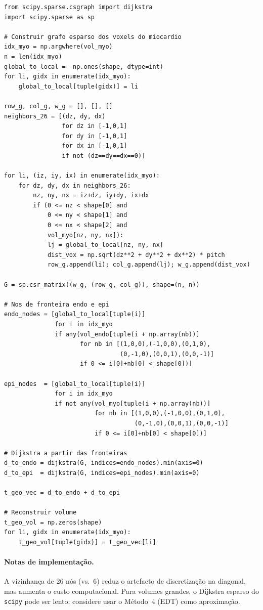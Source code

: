 \begin{lstlisting}
from scipy.sparse.csgraph import dijkstra
import scipy.sparse as sp

# Construir grafo esparso dos voxels do miocardio
idx_myo = np.argwhere(vol_myo)
n = len(idx_myo)
global_to_local = -np.ones(shape, dtype=int)
for li, gidx in enumerate(idx_myo):
    global_to_local[tuple(gidx)] = li

row_g, col_g, w_g = [], [], []
neighbors_26 = [(dz, dy, dx)
                for dz in [-1,0,1]
                for dy in [-1,0,1]
                for dx in [-1,0,1]
                if not (dz==dy==dx==0)]

for li, (iz, iy, ix) in enumerate(idx_myo):
    for dz, dy, dx in neighbors_26:
        nz, ny, nx = iz+dz, iy+dy, ix+dx
        if (0 <= nz < shape[0] and
            0 <= ny < shape[1] and
            0 <= nx < shape[2] and
            vol_myo[nz, ny, nx]):
            lj = global_to_local[nz, ny, nx]
            dist_vox = np.sqrt(dz**2 + dy**2 + dx**2) * pitch
            row_g.append(li); col_g.append(lj); w_g.append(dist_vox)

G = sp.csr_matrix((w_g, (row_g, col_g)), shape=(n, n))

# Nos de fronteira endo e epi
endo_nodes = [global_to_local[tuple(i)]
              for i in idx_myo
              if any(vol_endo[tuple(i + np.array(nb))]
                     for nb in [(1,0,0),(-1,0,0),(0,1,0),
                                (0,-1,0),(0,0,1),(0,0,-1)]
                     if 0 <= i[0]+nb[0] < shape[0])]

epi_nodes  = [global_to_local[tuple(i)]
              for i in idx_myo
              if not any(vol_myo[tuple(i + np.array(nb))]
                         for nb in [(1,0,0),(-1,0,0),(0,1,0),
                                    (0,-1,0),(0,0,1),(0,0,-1)]
                         if 0 <= i[0]+nb[0] < shape[0])]

# Dijkstra a partir das fronteiras
d_to_endo = dijkstra(G, indices=endo_nodes).min(axis=0)
d_to_epi  = dijkstra(G, indices=epi_nodes).min(axis=0)

t_geo_vec = d_to_endo + d_to_epi

# Reconstruir volume
t_geo_vol = np.zeros(shape)
for li, gidx in enumerate(idx_myo):
    t_geo_vol[tuple(gidx)] = t_geo_vec[li]
\end{lstlisting}

\paragraph{Notas de implementação.}
A vizinhança de 26 nós (vs.\ 6) reduz o artefacto de
discretização na diagonal, mas aumenta o custo computacional.
Para volumes grandes, o Dijkstra esparso do \texttt{scipy} pode
ser lento; considere usar o Método~4 (EDT) como aproximação.


